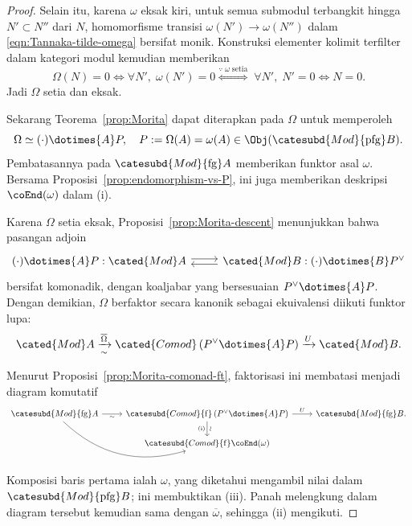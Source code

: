 \begin{proof}
	Selain itu, karena $\omega$ eksak kiri, untuk semua submodul terbangkit
	hingga $N'\subset N''$ dari $N$, homomorfisme transisi
	$\omega(N')\to\omega(N'')$ dalam \eqref{eqn:Tannaka-tilde-omega}
	bersifat monik. Konstruksi elementer kolimit terfilter dalam kategori
	modul kemudian memberikan
	\[ \Omega(N) = 0 \iff \forall N', \; \omega(N') = 0 \stackrel{\because \;\omega\;\text{setia}}{\iff} \; \forall N', \; N' = 0 \iff N = 0. \]
	Jadi $\Omega$ setia dan eksak.

	Sekarang Teorema~\ref{prop:Morita} dapat diterapkan pada $\Omega$ untuk
	memperoleh
	\[ \Omega \simeq (\cdot) \dotimes{A} P, \quad P := \Omega(A) = \omega(A) \in \Obj(\catesubd{Mod}{\mathrm{pfg}}B). \]
	Pembatasannya pada $\catesubd{Mod}{\mathrm{fg}}A$ memberikan funktor
	asal $\omega$. Bersama Proposisi~\ref{prop:endomorphism-vs-P}, ini juga
	memberikan deskripsi $\coEnd(\omega)$ dalam (i).

	Karena $\Omega$ setia eksak, Proposisi~\ref{prop:Morita-descent}
	menunjukkan bahwa pasangan adjoin
	\begin{equation*}\begin{tikzcd}
		(\cdot) \dotimes{A} P : \cated{Mod}A \arrow[shift left, r] & \cated{Mod}B: (\cdot) \dotimes{B} P^\vee \arrow[shift left, l]
	\end{tikzcd}\end{equation*}
	bersifat komonadik, dengan koaljabar yang bersesuaian
	$P^\vee\dotimes{A}P$. Dengan demikian, $\Omega$ berfaktor secara kanonik
	sebagai ekuivalensi diikuti funktor lupa:
	\[ \cated{Mod}A \xrightarrow[\sim]{\overline{\Omega}} \cated{Comod}\left(P^\vee \dotimes{A} P\right) \xrightarrow{U} \cated{Mod}B. \]

	Menurut Proposisi~\ref{prop:Morita-comonad-ft}, faktorisasi ini membatasi
	menjadi diagram komutatif
	\[\begin{tikzcd}
		\catesubd{Mod}{\mathrm{fg}}A \arrow[r, "\sim"'] \arrow[rd, bend right] & \catesubd{Comod}{\mathrm{f}} \left(P^\vee \dotimes{A} P\right) \arrow[r, "U"]  \arrow[d, "\sim" sloped, "{\text{(i)}}"'] & \catesubd{Mod}{\mathrm{fg}}B. \\
		& \catesubd{Comod}{\mathrm{f}}\coEnd(\omega) &
	\end{tikzcd}\]
	Komposisi baris pertama ialah $\omega$, yang diketahui mengambil nilai
	dalam $\catesubd{Mod}{\mathrm{pfg}}B$; ini membuktikan (iii). Panah
	melengkung dalam diagram tersebut kemudian sama dengan
	$\overline\omega$, sehingga (ii) mengikuti.
\end{proof}
